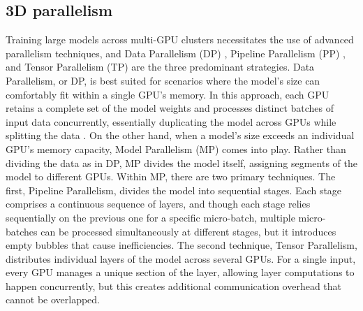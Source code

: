 \subsection{3D parallelism}
\label{DistributedDLsystem}
Training large models across multi-GPU clusters necessitates the use of advanced parallelism techniques, and Data Parallelism (DP) \cite{ParallelizedSGD,PyTorchDistributed}, Pipeline Parallelism (PP) \cite{PipeDream,DAPPLE,GPipe}, and Tensor Parallelism (TP) \cite{Megatron-LM,Megatron-LM1}are the three predominant strategies. Data Parallelism, or DP, is best suited for scenarios where the model's size can comfortably fit within a single GPU's memory. In this approach, each GPU retains a complete set of the model weights and processes distinct batches of input data concurrently, essentially duplicating the model across GPUs while splitting the data \cite{LargeDP, ParallelizedSGD, HeterogeneityDP,CommunicationDP}. On the other hand, when a model's size exceeds an individual GPU's memory capacity, Model Parallelism (MP) comes into play. Rather than dividing the data as in DP, MP divides the model itself, assigning segments of the model to different GPUs. Within MP, there are two primary techniques. The first, Pipeline Parallelism, divides the model into sequential stages. Each stage comprises a continuous sequence of layers, and though each stage relies sequentially on the previous one for a specific micro-batch, multiple micro-batches can be processed simultaneously at different stages, but it introduces empty bubbles that cause inefficiencies. The second technique, Tensor Parallelism, distributes individual layers of the model across several GPUs. For a single input, every GPU manages a unique section of the layer, allowing layer computations to happen concurrently, but this creates additional communication overhead that cannot be overlapped.

